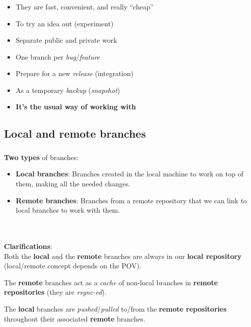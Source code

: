 \begin{frame}
  \frametitle{\insertsubsection}

  \begin{itemize}
  \item They are fast, convenient, and really ``cheap''\vspacing
  \item To try an idea out (experiment) \vspacing
  \item Separate public and private work \vspacing
  \item One branch per \textit{bug}/\textit{feature} \vspacing
  \item Prepare for a new \textit{release} (integration) \vspacing
  \item As a temporary \textit{backup} (\textit{snapshot}) \vspacing
  \item \textbf{It's the usual way of working with \git} \vspacing
  \end{itemize}
\end{frame}


\subsection{Local and remote branches}

\begin{frame}
  \frametitle{\insertsubsection}

  \textbf{Two types} of branches:
  \begin{itemize}
  \item \textbf{Local branches}: Branches created in the local machine
    to work on top of them, making all the needed changes.\vspacing

  \item \textbf{Remote branches}: Branches from a remote repository
    that we can link to local branches to work with them.
  \end{itemize}\  \\ \ \\


  \textbf{Clarifications}:\\
  Both the \textbf{local} and the  \textbf{remote} branches are always
  in our \textbf{local repository} (local/remote concept depends on
  the POV). \vspacing

  The \textbf{remote} branches act as a \textit{cache} of non-local
  branches in \textbf{remote repositories} (they are \textit{rsync-ed}). \vspacing

  The \textbf{local} branches are \textit{pushed}/\textit{pulled} to/from the \textbf{remote
    repositories} throughout their associated \textbf{remote} branches.

\end{frame}

